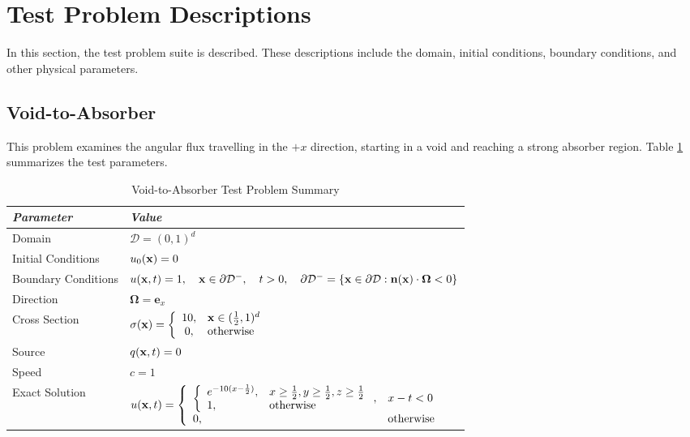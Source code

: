 \section{Test Problem Descriptions}
In this section, the test problem suite is described. These descriptions
include the domain, initial conditions, boundary conditions, and other
physical parameters.
\subsection{Void-to-Absorber}\label{sec:void_to_absorber}
This problem examines the angular flux travelling in the $+x$ direction,
starting in a void and reaching a strong absorber region.
Table \ref{tab:void_to_absorber} summarizes the test parameters.

\begin{table}[h]\caption{Void-to-Absorber Test Problem Summary}
\label{tab:void_to_absorber}
\centering
\begin{tabular}{l l}\toprule
\emph{Parameter} & \emph{Value}\\\midrule
Domain & $\mathcal{D} = (0,1)^d$\\
Initial Conditions & $u_0(\mathbf{x})=0$\\
Boundary Conditions & $u(\mathbf{x},t)=1,\quad \mathbf{x}\in\partial\mathcal{D}^-,\quad t>0,
   \quad\partial\mathcal{D}^-=\{\mathbf{x}\in\partial\mathcal{D}:\mathbf{n}(\mathbf{x})
   \cdot\mathbf{\Omega}<0\}$\\
Direction & $\mathbf{\Omega} = \mathbf{e}_x$\\
Cross Section & $\sigma(\mathbf{x})=\left\{\begin{array}{c l}
   10, & \mathbf{x}\in(\frac{1}{2},1)^d\\
   0,  & \mbox{otherwise}\end{array}\right.$\\
Source & $q(\mathbf{x},t)=0$\\
Speed & $c=1$\\
Exact Solution & $u(\mathbf{x},t)=\left\{\begin{array}{l l}
   \left\{\begin{array}{l l}
      e^{-10(x-\frac{1}{2})}, & x\ge\frac{1}{2}, y\ge\frac{1}{2}, z\ge\frac{1}{2}\\
      1,                      & \mbox{otherwise}
   \end{array}\right., & x-t<0\\
   0, & \mbox{otherwise}
   \end{array}\right.$ \\
\bottomrule\end{tabular}
\end{table}
